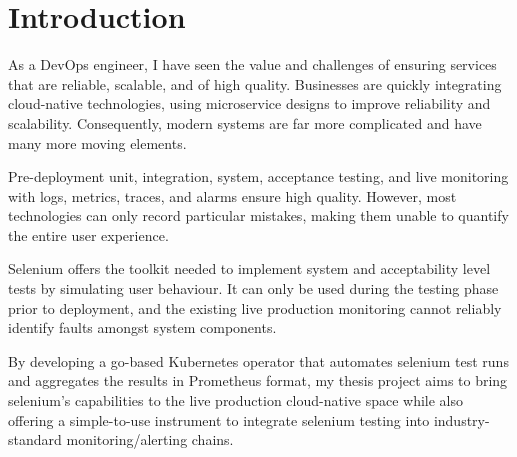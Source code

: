 \chapter{Introduction}
\label{ch:intro}

As a DevOps engineer, I have seen the value and challenges of ensuring services that are reliable, scalable, and of high quality. Businesses are quickly integrating cloud-native technologies, using microservice designs to improve reliability and scalability. Consequently, modern systems are far more complicated and have many more moving elements.

Pre-deployment unit, integration, system, acceptance testing, and live monitoring with logs, metrics, traces, and alarms ensure high quality. However, most technologies can only record particular mistakes, making them unable to quantify the entire user experience.

Selenium offers the toolkit needed to implement system and acceptability level tests by simulating user behaviour. It can only be used during the testing phase prior to deployment, and the existing live production monitoring cannot reliably identify faults amongst system components.

By developing a go-based Kubernetes operator that automates selenium test runs and aggregates the results in Prometheus format, my thesis project aims to bring selenium's capabilities to the live production cloud-native space while also offering a simple-to-use instrument to integrate selenium testing into industry-standard monitoring/alerting chains.